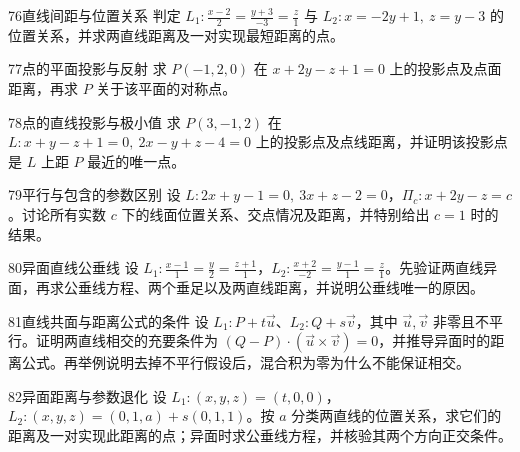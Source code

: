 \begin{exercise}{76}{直线间距与位置关系}
判定 $L_1:\frac{x-2}{2}=\frac{y+3}{-3}=\frac z1$ 与 $L_2:x=-2y+1,\ z=y-3$ 的位置关系，并求两直线距离及一对实现最短距离的点。
\end{exercise}
\begin{exercise}{77}{点的平面投影与反射}
求 $P(-1,2,0)$ 在 $x+2y-z+1=0$ 上的投影点及点面距离，再求 $P$ 关于该平面的对称点。
\end{exercise}
\begin{exercise}{78}{点的直线投影与极小值}
求 $P(3,-1,2)$ 在 $L:x+y-z+1=0,\ 2x-y+z-4=0$ 上的投影点及点线距离，并证明该投影点是 $L$ 上距 $P$ 最近的唯一点。
\end{exercise}
\begin{exercise}{79}{平行与包含的参数区别}
设 $L:2x+y-1=0,\ 3x+z-2=0$，$\Pi_c:x+2y-z=c$。讨论所有实数 $c$ 下的线面位置关系、交点情况及距离，并特别给出 $c=1$ 时的结果。
\end{exercise}
\begin{exercise}{80}{异面直线公垂线}
设 $L_1:\frac{x-1}{1}=\frac y2=\frac{z+1}{1}$，$L_2:\frac{x+2}{-2}=\frac{y-1}{1}=\frac z1$。先验证两直线异面，再求公垂线方程、两个垂足以及两直线距离，并说明公垂线唯一的原因。
\end{exercise}
\begin{exercise}{81}{直线共面与距离公式的条件}
设 $L_1:P+t\vec u$、$L_2:Q+s\vec v$，其中 $\vec u,\vec v$ 非零且不平行。证明两直线相交的充要条件为 $(Q-P)\cdot(\vec u\times\vec v)=0$，并推导异面时的距离公式。再举例说明去掉不平行假设后，混合积为零为什么不能保证相交。
\end{exercise}
\begin{exercise}{82}{异面距离与参数退化}
设 $L_1:(x,y,z)=(t,0,0)$，$L_2:(x,y,z)=(0,1,a)+s(0,1,1)$。按 $a$ 分类两直线的位置关系，求它们的距离及一对实现此距离的点；异面时求公垂线方程，并核验其两个方向正交条件。
\end{exercise}

